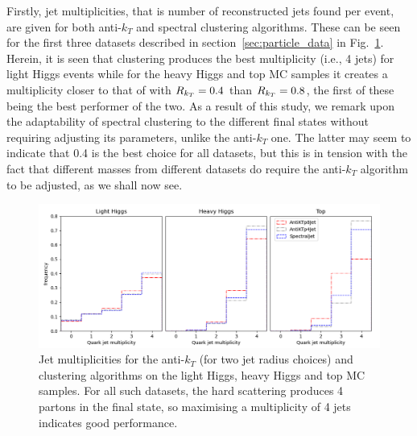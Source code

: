 Firstly, jet multiplicities, that is number of reconstructed jets found per event, are given for both anti-$k_T$ and spectral clustering algorithms.
These can be seen for the first three datasets described in section~\ref{sec:particle_data} in Fig.~\ref{fig:multiplicity}. Herein, it
 is seen that \spectral{} clustering produces the best multiplicity (i.e., 4 jets) for light Higgs events while for 
         the heavy Higgs and top MC samples  
        it creates a multiplicity closer to that of \antikt{} with \(R_{k_T}{} = 0.4\) 
        than \(R_{k_T}{} = 0.8\), the first of these being the best performer of the two. As a result of this study, we remark upon the adaptability of spectral clustering to the different final states without requiring adjusting its parameters, unlike the anti-$k_T$ one. The latter may seem to indicate that 0.4 is the best choice for all datasets, but this is in tension with the fact that different masses from different datasets do require the  anti-$k_T$ algorithm to be adjusted, as we shall now see. 



\begin{figure}[htp]
    \begin{center}
        \includegraphics[width=1.0\textwidth]{graphics/multiplicity/all3.png}
    \end{center}
    \caption{Jet multiplicities for the anti-$k_T$ (for two jet radius choices) and \spectral{} clustering algorithms on the light Higgs, heavy Higgs and top MC 
 samples. For all such datasets, the hard scattering produces  4 partons in the final  state, so maximising a multiplicity of 4 jets indicates good performance.   
    }\label{fig:multiplicity}
\end{figure}    



